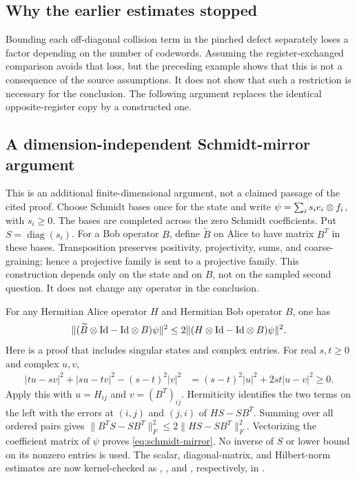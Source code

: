 \documentclass[11pt]{article}
\begin{document}
\subsection*{Why the earlier estimates stopped}

Bounding each off-diagonal collision term in the pinched defect separately
loses a factor depending on the number of codewords. Assuming the
register-exchanged comparison avoids that loss, but the preceding example
shows that this is not a consequence of the source assumptions. It does not
show that such a restriction is necessary for the conclusion. The following
argument replaces the identical opposite-register copy by a constructed one.

\subsection*{A dimension-independent Schmidt-mirror argument}

This is an additional finite-dimensional argument, not a claimed passage of
the cited proof. Choose Schmidt bases once for the state and write
$\psi=\sum_i s_i e_i\otimes f_i$, with $s_i\geq0$. The bases are completed across
the zero Schmidt coefficients. Put $S=\operatorname{diag}(s_i)$.
For a Bob operator $B$, define $\widetilde B$ on Alice to have matrix $B^T$
in these bases. Transposition preserves positivity, projectivity, sums, and
coarse-graining; hence a projective family is sent to a projective family.
This construction depends only on the state and on $B$, not on the sampled
second question. It does not change any operator in the conclusion.

For any Hermitian Alice operator $H$ and Hermitian Bob operator $B$, one has
\begin{equation}\label{eq:schmidt-mirror}
 \| (\widetilde B\otimes\mathrm{Id}-\mathrm{Id}\otimes B)\psi\|^2
 \leq 2\| (H\otimes\mathrm{Id}-\mathrm{Id}\otimes B)\psi\|^2.
\end{equation}
Here is a proof that includes singular states and complex entries. For real
$s,t\geq0$ and complex $u,v$,
\begin{align*}
 |tu-sv|^2+|su-tv|^2-(s-t)^2|v|^2
   &=(s-t)^2|u|^2+2st|u-v|^2\geq0.
\end{align*}
Apply this with $u=H_{ij}$ and $v=(B^T)_{ij}$. Hermiticity identifies the two
terms on the left with the errors at $(i,j)$ and $(j,i)$ of $HS-SB^T$.
Summing over all ordered pairs gives
$\|B^TS-SB^T\|_F^2\leq2\|HS-SB^T\|_F^2$.
Vectorizing the coefficient matrix of $\psi$ proves
\eqref{eq:schmidt-mirror}. No inverse of $S$ or lower bound on its nonzero
entries is used. The scalar, diagonal-matrix, and Hilbert-norm estimates are
now kernel-checked as ,
, and
, respectively, in
.
\end{document}
